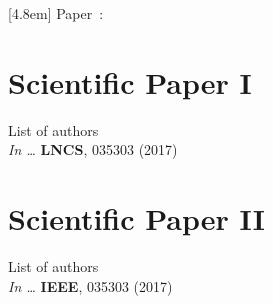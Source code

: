 \renewcommand{\appendixname}{PAPER} %

  [4.8em]%
  {\vspace*{1em}\bfseries\normalsize}%
  {\hspace*{-4.8em}Paper\ \thecontentslabel:\quad}%
  {}%
  {\normalsize\hfill\contentspage}%

\fancyhf{}   %
\fancyhead{} %
\renewcommand{\headrulewidth}{0pt} %
\renewcommand{\chaptitlefont}{\bfseries\Large}


\chapter{Scientific Paper I}

\noindent List of authors\\

\noindent \textit{In \Proc \IntlConf \ldots} \textbf{LNCS}, 035303 (2017)
\cleardoublepage



\chapter{Scientific Paper II}

\noindent List of authors\\

\noindent \textit{In \Proc \IntlConf \ldots} \textbf{IEEE}, 035303 (2017)
\cleardoublepage






